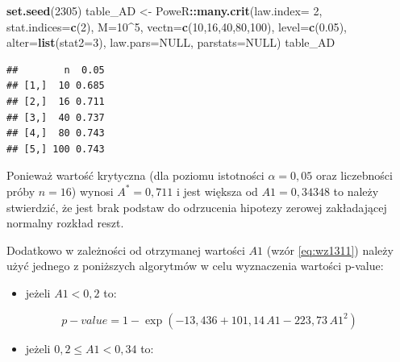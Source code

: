 \documentclass[polish,]{book}
\newenvironment{Shaded}{\begin{snugshade}}{\end{snugshade}}
\newcommand{\DataTypeTok}[1]{\textcolor[rgb]{0.13,0.29,0.53}{#1}}
\newcommand{\DecValTok}[1]{\textcolor[rgb]{0.00,0.00,0.81}{#1}}
\newcommand{\FloatTok}[1]{\textcolor[rgb]{0.00,0.00,0.81}{#1}}
\newcommand{\KeywordTok}[1]{\textcolor[rgb]{0.13,0.29,0.53}{\textbf{#1}}}
\newcommand{\NormalTok}[1]{#1}
\newcommand{\OperatorTok}[1]{\textcolor[rgb]{0.81,0.36,0.00}{\textbf{#1}}}
\newcommand{\OtherTok}[1]{\textcolor[rgb]{0.56,0.35,0.01}{#1}}
\newcommand{\StringTok}[1]{\textcolor[rgb]{0.31,0.60,0.02}{#1}}
\providecommand{\tightlist}{%
  \setlength{\itemsep}{0pt}\setlength{\parskip}{0pt}}
\begin{document}
\begin{Shaded}
\begin{Highlighting}[]
\KeywordTok{set.seed}\NormalTok{(}\DecValTok{2305}\NormalTok{)}
\NormalTok{table_AD <-}\StringTok{ }\NormalTok{PoweR}\OperatorTok{::}\KeywordTok{many.crit}\NormalTok{(}\DataTypeTok{law.index=} \DecValTok{2}\NormalTok{, }\DataTypeTok{stat.indices=}\KeywordTok{c}\NormalTok{(}\DecValTok{2}\NormalTok{), }\DataTypeTok{M=}\DecValTok{10}\OperatorTok{^}\DecValTok{5}\NormalTok{,}
                             \DataTypeTok{vectn=}\KeywordTok{c}\NormalTok{(}\DecValTok{10}\NormalTok{,}\DecValTok{16}\NormalTok{,}\DecValTok{40}\NormalTok{,}\DecValTok{80}\NormalTok{,}\DecValTok{100}\NormalTok{),}
                             \DataTypeTok{level=}\KeywordTok{c}\NormalTok{(}\FloatTok{0.05}\NormalTok{),}
                             \DataTypeTok{alter=}\KeywordTok{list}\NormalTok{(}\DataTypeTok{stat2=}\DecValTok{3}\NormalTok{), }\DataTypeTok{law.pars=}\OtherTok{NULL}\NormalTok{, }\DataTypeTok{parstats=}\OtherTok{NULL}\NormalTok{)}
\NormalTok{table_AD}
\end{Highlighting}
\end{Shaded}

\begin{verbatim}
##        n  0.05
## [1,]  10 0.685
## [2,]  16 0.711
## [3,]  40 0.737
## [4,]  80 0.743
## [5,] 100 0.743
\end{verbatim}

Ponieważ wartość krytyczna (dla poziomu istotności \(\alpha = 0,05\) oraz liczebności próby \(n=16\)) wynosi \(A^* = 0,711\) i jest większa od \(A1 = 0,34348\) to należy stwierdzić, że jest brak
podstaw do odrzucenia hipotezy zerowej zakładającej normalny rozkład reszt.

Dodatkowo w zależności od otrzymanej wartości \(A1\) (wzór \eqref{eq:wz1311}) należy użyć jednego z poniższych algorytmów w celu wyznaczenia wartości p-value:

\begin{itemize}
\tightlist
\item
  jeżeli \(A1 < 0,2\) to:
\end{itemize}

\begin{equation}
p-value=1-\exp(-13,436+101,14\,A1-223,73\,A1^2)
\label{eq:wz1312a}
\end{equation}

\begin{itemize}
\tightlist
\item
  jeżeli \(0,2\leq A1<0,34\) to:
\end{itemize}
\end{document}
